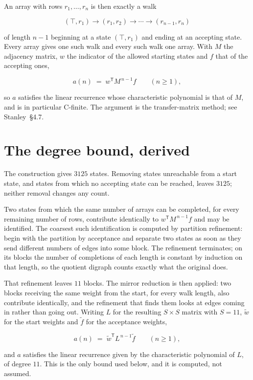 \documentclass[11pt]{article}
\theoremstyle{definition}
\begin{document}
An array with rows $r_1,\dots,r_n$ is then exactly a walk

\[(\top,r_1) \to (r_1,r_2) \to \cdots \to (r_{n-1},r_n)\]

of length $n-1$ beginning at a state $(\top,r_1)$ and ending at an accepting state. Every array gives one such walk and every such walk one array. With $M$ the adjacency matrix, $w$ the indicator of the allowed starting states and $f$ that of the accepting ones,

\[a(n) \;=\; w^{\mathsf T} M^{\,n-1} f \qquad (n \ge 1),\]

so $a$ satisfies the linear recurrence whose characteristic polynomial is that of $M$, and is in particular C-finite. The argument is the transfer-matrix method; see Stanley~\S4.7.

\section{The degree bound, derived}

The construction gives $3125$ states. Removing states unreachable from a start state, and states from which no accepting state can be reached, leaves $3125$; neither removal changes any count.

Two states from which the same number of arrays can be completed, for every remaining number of rows, contribute identically to $w^{\mathsf T}M^{\,n-1}f$ and may be identified. The coarsest such identification is computed by partition refinement: begin with the partition by acceptance and separate two states as soon as they send different numbers of edges into some block. The refinement terminates; on its blocks the number of completions of each length is constant by induction on that length, so the quotient digraph counts exactly what the original does.

That refinement leaves $11$ blocks. The mirror reduction is then applied: two blocks receiving the same weight from the start, for every walk length, also contribute identically, and the refinement that finds them looks at edges coming in rather than going out. Writing $L$ for the resulting $S \times S$ matrix with $S = 11$, $\tilde w$ for the start weights and $\tilde f$ for the acceptance weights,

\[a(n) \;=\; \tilde w^{\mathsf T} L^{\,n-1} \tilde f \qquad (n \ge 1),\]

and $a$ satisfies the linear recurrence given by the characteristic polynomial of $L$, of degree $11$. This is the only bound used below, and it is computed, not assumed.
\end{document}
